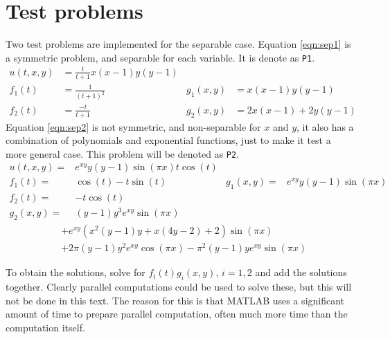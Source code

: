 \section{Test problems} \label{sec:test}
Two test problems are implemented for the separable case. Equation \eqref{eqn:sep1} is a symmetric problem, and separable for each variable. It is denote as \texttt{P1}. 
\begin{equation} \label{eqn:sep1}
\begin{aligned}
 u(t,x,y)&= \frac{t}{t+1} x(x-1)y(y-1) \\
 f_1(t)&=\frac{1}{(t+1)^2} & g_1(x,y)&= x(x-1)y(y-1) \\
 f_2(t) &= \frac{-t}{t+1} & g_2(x,y)& = 2x(x-1) +2y(y-1)
 \end{aligned}
\end{equation}
Equation \eqref{eqn:sep2} is not symmetric, and non-separable for $x$ and $y$, it also has a combination of polynomials and exponential functions, just to make it test a more general case. 
This problem will be denoted as \texttt{P2}.\\
\begin{equation} \label{eqn:sep2}
\begin{aligned}
 u(t,x,y)=& e^{xy}y(y-1) \sin( \pi x)t \cos(t)& \\
 f_1(t) =& \cos(t)-t \sin(t)  & g_1(x,y) =&e^{xy}y(y-1) \sin( \pi x)\\
 f_2(t) =& -t \cos(t) \\ g_2(x,y) =&(y-1)y^3e^{xy} \sin ( \pi x)
 \end{aligned}
\end{equation}
\begin{equation*}
\begin{aligned}
&+e^{xy}(x^2(y-1)y+x(4y-2)+2) \sin( \pi x) \\&+2 \pi (y-1) y^2 e^{xy} \cos( \pi x)- \pi^2 (y-1)y e^{xy} \sin( \pi x )
 \end{aligned}
\end{equation*}

To obtain the solutions, solve for $f_i(t) g_i(x,y)$, $i = 1,2 $ and add the solutions together. Clearly parallel computations could be used to solve these, but this will not be done in this text. The reason for this is that MATLAB uses a significant amount of time to prepare parallel computation, often much more time than the computation itself.\\


